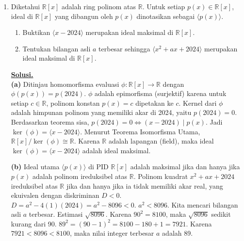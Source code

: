 \documentclass[12pt,twoside]{article}
\newenvironment{solution}
{
	\par\noindent\textbf{\underline{Solusi.}}\\
}
{
	\par
}
\begin{document}
\begin{enumerate}
  \item Diketahui $\mathbb{R}[x]$ adalah ring polinom atas $\mathbb{R}$. Untuk setiap $p(x) \in \mathbb{R}[x]$, ideal di $\mathbb{R}[x]$ yang dibangun oleh $p(x)$ dinotasikan sebagai $\langle p(x) \rangle$.
        \begin{enumerate}
          \item Buktikan $\langle x - 2024 \rangle$ merupakan ideal maksimal di $\mathbb{R}[x]$.
          \item Tentukan bilangan asli $a$ terbesar sehingga $\langle x^2 + ax + 2024 \rangle$ merupakan ideal maksimal di $\mathbb{R}[x]$.
        \end{enumerate}
        \begin{solution}
          \textbf{(a)}
          Ditinjau homomorfisma evaluasi $\phi: \mathbb{R}[x] \to \mathbb{R}$ dengan $\phi(p(x)) = p(2024)$.
          $\phi$ adalah epimorfisma (surjektif) karena untuk setiap $c \in \mathbb{R}$, polinom konstan $p(x)=c$ dipetakan ke $c$.
          Kernel dari $\phi$ adalah himpunan polinom yang memiliki akar di 2024, yaitu $p(2024)=0$.
          Berdasarkan teorema sisa, $p(2024)=0 \iff (x-2024) \mid p(x)$.
          Jadi $\ker(\phi) = \langle x-2024 \rangle$.
          Menurut Teorema Isomorfisma Utama, $\mathbb{R}[x]/\ker(\phi) \cong \mathbb{R}$.
          Karena $\mathbb{R}$ adalah lapangan (field), maka ideal $\ker(\phi) = \langle x-2024 \rangle$ adalah ideal maksimal.

          \textbf{(b)}
          Ideal utama $\langle p(x) \rangle$ di PID $\mathbb{R}[x]$ adalah maksimal jika dan hanya jika $p(x)$ adalah polinom ireduksibel atas $\mathbb{R}$.
          Polinom kuadrat $x^2 + ax + 2024$ ireduksibel atas $\mathbb{R}$ jika dan hanya jika ia tidak memiliki akar real, yang ekuivalen dengan diskriminan $D < 0$.
          $D = a^2 - 4(1)(2024) = a^2 - 8096 < 0$.
          $a^2 < 8096$.
          Kita mencari bilangan asli $a$ terbesar.
          Estimasi $\sqrt{8096}$. Karena $90^2 = 8100$, maka $\sqrt{8096}$ sedikit kurang dari 90.
          $89^2 = (90-1)^2 = 8100 - 180 + 1 = 7921$.
          Karena $7921 < 8096 < 8100$, maka nilai integer terbesar $a$ adalah 89.
        \end{solution}


\end{enumerate}
\end{document}
